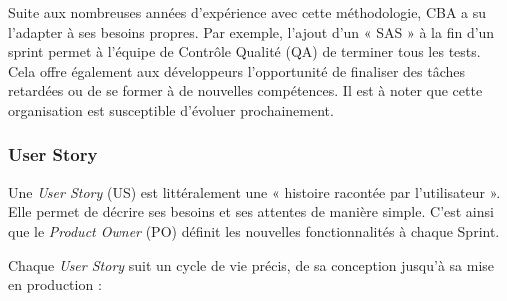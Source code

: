 \documentclass{article}
\begin{document}
\newpage

Suite aux nombreuses années d'expérience avec cette méthodologie, CBA a su l'adapter à ses besoins propres. Par exemple, l'ajout d'un « SAS » à la fin d'un sprint permet à l'équipe de Contrôle Qualité (QA) de terminer tous les tests. Cela offre également aux développeurs l'opportunité de finaliser des tâches retardées ou de se former à de nouvelles compétences. Il est à noter que cette organisation est susceptible d'évoluer prochainement.

\subsubsection{User Story}

Une \textit{User Story} (US) est littéralement une « histoire racontée par l'utilisateur ». Elle permet de décrire ses besoins et ses attentes de manière simple. C'est ainsi que le \textit{Product Owner} (PO) définit les nouvelles fonctionnalités à chaque Sprint.

Chaque \textit{User Story} suit un cycle de vie précis, de sa conception jusqu'à sa mise en production :
\end{document}
